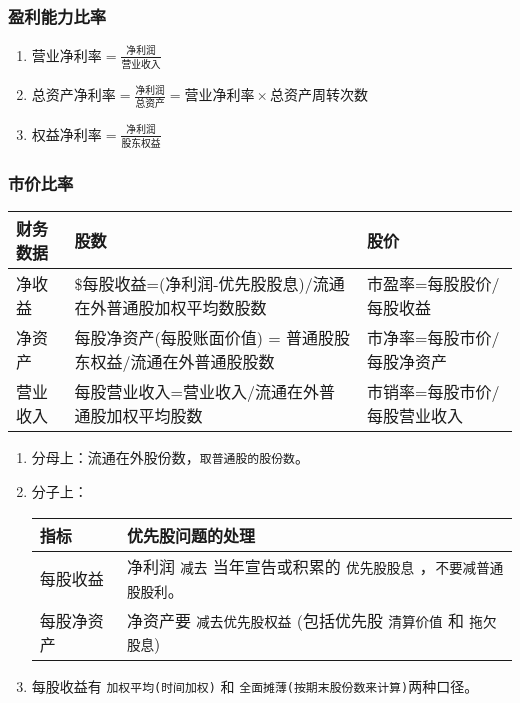 \documentclass[11pt]{article}
\begin{document}
\subsubsection{盈利能力比率}
\label{sec:orgd3e906f}
\begin{enumerate}
\item \(营业净利率 = \frac{净利润}{营业收入}\)
\item \(总资产净利率 = \frac{净利润}{总资产}=营业净利率\times 总资产周转次数\)
\item \(权益净利率 = \frac{净利润}{股东权益}\)
\end{enumerate}
\subsubsection{市价比率}
\label{sec:org3ca7398}
\begin{center}
\begin{tabular}{lll}
财务数据 & 股数 & 股价\\
\hline
净收益 & \$每股收益=(净利润-优先股股息)/流通在外普通股加权平均数股数 & 市盈率=每股股价/每股收益\\
净资产 & 每股净资产(每股账面价值) = 普通股股东权益/流通在外普通股股数 & 市净率=每股市价/每股净资产\\
营业收入 & 每股营业收入=营业收入/流通在外普通股加权平均股数 & 市销率=每股市价/每股营业收入\\
\end{tabular}
\end{center}
\begin{enumerate}
\item 分母上：流通在外股份数，\texttt{取普通股的股份数}。
\item 分子上：
\begin{center}
\begin{tabular}{ll}
指标 & 优先股问题的处理\\
\hline
每股收益 & 净利润 \texttt{减去} 当年宣告或积累的 \texttt{优先股股息} ，\texttt{不要减普通股股利}。\\
每股净资产 & 净资产要 \texttt{减去优先股权益} (包括优先股 \texttt{清算价值} 和 \texttt{拖欠股息})\\
\end{tabular}
\end{center}
\item 每股收益有 \texttt{加权平均(时间加权)} 和 \texttt{全面摊薄(按期末股份数来计算)}两种口径。
\end{enumerate}
\end{document}
